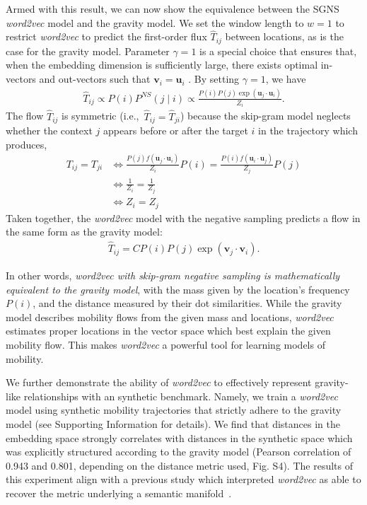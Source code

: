 \documentclass[12pt]{article} %
\newcommand{\vect}[1]{\boldsymbol{#1}}
\def\given{\mid}
\def\ie{i.e.,~}
\begin{document}
Armed with this result, we can now show the equivalence between the SGNS {\it word2vec} model and the gravity model.
We set the window length to $w=1$ to restrict {\it word2vec} to predict the first-order flux $\hat T_{ij}$ between locations, as is the case for the gravity model.
Parameter $\gamma=1$ is a special choice that ensures that, when the embedding dimension is sufficiently large, there exists optimal in-vectors and out-vectors such that $\vect{v}_i = \vect{u}_i$ \autocite{levy2014neural}.
By setting $\gamma=1$,  we have 
\begin{align}
	\label{eq:flow_w2v}
	\hat{T}_{ij} \propto P(i) P^{NS}(j\given i) \propto \frac{P(i)P(j)\exp(\bm{u}_j \cdot \bm{u}_{i})}{Z_i}.
\end{align}
The flow $\widehat{T}_{ij}$ is symmetric (\ie $\widehat{T}_{ij}=\widehat{T}_{ji}$) because the skip-gram model neglects whether the context $j$ appears before or after the target $i$ in the trajectory which produces,
\begin{align}
	\label{eq:unbiasef2}
	T_{ij}=T_{ji} &\iff \frac{P(j) f(\vect{u}_j \cdot \vect{u}_{i}) }{Z_i} P(i) = \frac{P(i)  f(\vect{u}_i \cdot \vect{u}_{j}) }{Z_j} P(j) \nonumber \\
	&\iff \frac{1}{Z_i}= \frac{1}{Z_j}  \nonumber \\
	&\iff Z_i = Z_j
\end{align}
Taken together, the {\it word2vec} model with the negative sampling predicts a flow in the same form as the gravity model:
\begin{align}
	\hat{T}_{ij}=  C P(i) P(j)  \exp(\bm{v}_j \cdot \bm{v}_{i}). \label{eq:flow_w2v_ng0}
\end{align}

In other words, \emph{word2vec with skip-gram negative sampling is mathematically equivalent to the gravity model}, with the mass given by the location's frequency $P(i)$, and the distance measured by their dot similarities.
While the gravity model describes mobility flows from the given mass and locations, {\it word2vec}
estimates proper locations in the vector space which best explain the given mobility flow.
This makes \textit{word2vec} a powerful tool for learning models of mobility.

We further demonstrate the ability of \textit{word2vec} to effectively represent gravity-like relationships with an synthetic benchmark. Namely, we train a \textit{word2vec} model using synthetic mobility trajectories that strictly adhere to the gravity model (see Supporting Information for details). 
We find that distances in the embedding space strongly correlates with distances in the synthetic space which was explicitly structured according to the gravity model (Pearson correlation of 0.943 and 0.801, depending on the distance metric used, Fig. S4).
The results of this experiment align with a previous study which interpreted \textit{word2vec} as able to recover the metric underlying a semantic manifold~\autocite{hashimoto2016word}.
\end{document}
